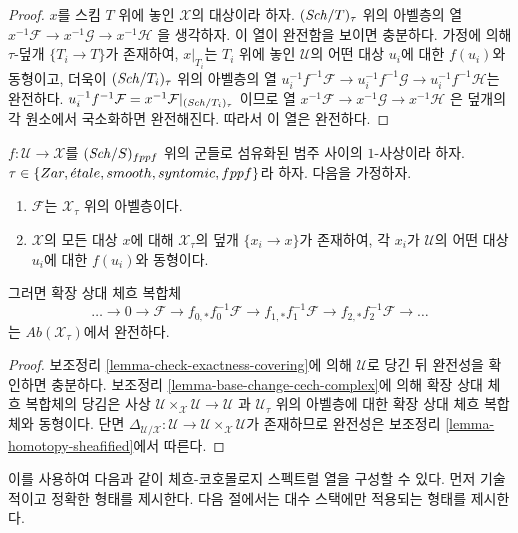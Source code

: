 \begin{proof}
$x$를 스킴 $T$ 위에 놓인 $\mathcal{X}$의 대상이라 하자.
$(\mathit{Sch}/T)_\tau$ 위의 아벨층의 열
$x^{-1}\mathcal{F} \to x^{-1}\mathcal{G} \to x^{-1}\mathcal{H}$
을 생각하자. 이 열이 완전함을 보이면 충분하다.
가정에 의해 $\tau$-덮개 $\{T_i \to T\}$가 존재하여,
$x|_{T_i}$는 $T_i$ 위에 놓인 $\mathcal{U}$의 어떤 대상 $u_i$에 대한
$f(u_i)$와 동형이고, 더욱이 $(\mathit{Sch}/T_i)_\tau$ 위의 아벨층의 열
$u_i^{-1}f^{-1}\mathcal{F} \to u_i^{-1}f^{-1}\mathcal{G} \to
u_i^{-1}f^{-1}\mathcal{H}$는 완전하다.
$u_i^{-1}f^{-1}\mathcal{F} = x^{-1}\mathcal{F}|_{(\mathit{Sch}/T_i)_\tau}$
이므로 열
$x^{-1}\mathcal{F} \to x^{-1}\mathcal{G} \to x^{-1}\mathcal{H}$
은 덮개의 각 원소에서 국소화하면 완전해진다.
따라서 이 열은 완전하다.
\end{proof}

\begin{proposition}
\label{proposition-exactness-cech-complex}
$f : \mathcal{U} \to \mathcal{X}$를 $(\mathit{Sch}/S)_{fppf}$ 위의
군들로 섬유화된 범주 사이의 $1$-사상이라 하자.
$\tau \in \{Zar, {\acute{e}tale}, smooth, syntomic, fppf\}$라 하자.
다음을 가정하자.
\begin{enumerate}
\item $\mathcal{F}$는 $\mathcal{X}_\tau$ 위의 아벨층이다.
\item $\mathcal{X}$의 모든 대상 $x$에 대해
$\mathcal{X}_\tau$의 덮개 $\{x_i \to x\}$가 존재하여,
각 $x_i$가 $\mathcal{U}$의 어떤 대상 $u_i$에 대한
$f(u_i)$와 동형이다.
\end{enumerate}
그러면 확장 상대 체흐 복합체
$$
\ldots \to 0 \to
\mathcal{F} \to
f_{0, *}f_0^{-1}\mathcal{F} \to
f_{1, *}f_1^{-1}\mathcal{F} \to
f_{2, *}f_2^{-1}\mathcal{F} \to \ldots
$$
는 $\textit{Ab}(\mathcal{X}_\tau)$에서 완전하다.
\end{proposition}

\begin{proof}
보조정리 \ref{lemma-check-exactness-covering}에 의해
$\mathcal{U}$로 당긴 뒤 완전성을 확인하면 충분하다.
보조정리 \ref{lemma-base-change-cech-complex}에 의해
확장 상대 체흐 복합체의 당김은 사상
$\mathcal{U} \times_\mathcal{X} \mathcal{U} \to \mathcal{U}$
과 $\mathcal{U}_\tau$ 위의 아벨층에 대한 확장 상대 체흐 복합체와
동형이다. 단면
$\Delta_{\mathcal{U}/\mathcal{X}} : \mathcal{U} \to
\mathcal{U} \times_\mathcal{X} \mathcal{U}$가 존재하므로
완전성은 보조정리 \ref{lemma-homotopy-sheafified}에서 따른다.
\end{proof}

\noindent
이를 사용하여 다음과 같이 체흐-코호몰로지 스펙트럴 열을
구성할 수 있다. 먼저 기술적이고 정확한 형태를 제시한다.
다음 절에서는 대수 스택에만 적용되는 형태를 제시한다.

